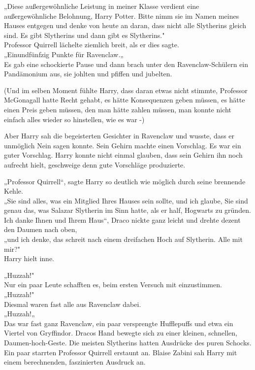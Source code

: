 {„Diese außergewöhnliche Leistung in meiner Klasse verdient eine außergewöhnliche Belohnung, Harry Potter. Bitte nimm sie im Namen meines Hauses entgegen und denke von heute an daran, dass nicht alle Slytherins gleich sind. Es gibt Slytherins und dann gibt es Slytherins."\\ Professor Quirrell lächelte ziemlich breit, als er dies sagte.\\ „Einundfünfzig Punkte für Ravenclaw.„\\ Es gab eine schockierte Pause und dann brach unter den Ravenclaw-Schülern ein Pandämonium aus, sie johlten und pfiffen und jubelten.

(Und im selben Moment fühlte Harry, dass daran etwas nicht stimmte, Professor McGonagall hatte Recht gehabt, es hätte Konsequenzen geben müssen, es hätte einen Preis geben müssen, den man hätte zahlen müssen, man konnte nicht einfach alles wieder so hinstellen, wie es war -)

Aber Harry sah die begeisterten Gesichter in Ravenclaw und wusste, dass er unmöglich Nein sagen konnte. Sein Gehirn machte einen Vorschlag. Es war ein guter Vorschlag. Harry konnte nicht einmal glauben, dass sein Gehirn ihn noch aufrecht hielt, geschweige denn gute Vorschläge produzierte.

„Professor Quirrell“, sagte Harry so deutlich wie möglich durch seine brennende Kehle.\\ „Sie sind alles, was ein Mitglied Ihres Hauses sein sollte, und ich glaube, Sie sind genau das, was Salazar Slytherin im Sinn hatte, als er half, Hogwarts zu gründen. Ich danke Ihnen und Ihrem Haus“, Draco nickte ganz leicht und drehte dezent den Daumen nach oben,\\ „und ich denke, das schreit nach einem dreifachen Hoch auf Slytherin. Alle mit mir?"\\ Harry hielt inne.

„Huzzah!"\\ Nur ein paar Leute schafften es, beim ersten Versuch mit einzustimmen.\\ „Huzzah!"\\ Diesmal waren fast alle aus Ravenclaw dabei.\\ „Huzzah!„\\ Das war fast ganz Ravenclaw, ein paar versprengte Hufflepuffs und etwa ein Viertel von Gryffindor. Dracos Hand bewegte sich zu einer kleinen, schnellen, Daumen-hoch-Geste. Die meisten Slytherins hatten Ausdrücke des puren Schocks.\\ Ein paar starrten Professor Quirrell erstaunt an. Blaise Zabini sah Harry mit einem berechnenden, faszinierten Ausdruck an.

}
